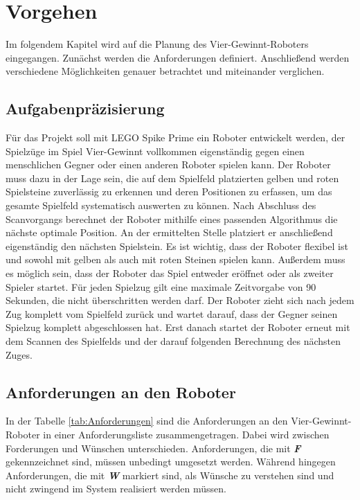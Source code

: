 \chapter{Vorgehen}
Im folgendem Kapitel wird auf die Planung des Vier-Gewinnt-Roboters eingegangen. Zunächst werden die Anforderungen definiert. Anschließend werden verschiedene Möglichkeiten genauer betrachtet und miteinander verglichen.

\section{Aufgabenpräzisierung}
Für das Projekt soll mit LEGO Spike Prime ein Roboter entwickelt werden, der Spielzüge im Spiel Vier-Gewinnt vollkommen eigenständig gegen einen menschlichen Gegner oder einen anderen Roboter spielen kann. Der Roboter muss dazu in der Lage sein, die auf dem Spielfeld platzierten gelben und roten Spielsteine zuverlässig zu erkennen und deren Positionen zu erfassen, um das gesamte Spielfeld systematisch auswerten zu können.\newline
Nach Abschluss des Scanvorgangs berechnet der Roboter mithilfe eines passenden Algorithmus die nächste optimale Position. An der ermittelten Stelle platziert er anschließend eigenständig den nächsten Spielstein. Es ist wichtig, dass der Roboter flexibel ist und sowohl mit gelben als auch mit roten Steinen spielen kann. Außerdem muss es möglich sein, dass der Roboter das Spiel entweder eröffnet oder als zweiter Spieler startet.\newline
Für jeden Spielzug gilt eine maximale Zeitvorgabe von 90 Sekunden, die nicht überschritten werden darf. Der Roboter zieht sich nach jedem Zug komplett vom Spielfeld zurück und wartet darauf, dass der Gegner seinen Spielzug komplett abgeschlossen hat. Erst danach startet der Roboter erneut mit dem Scannen des Spielfelds und der darauf folgenden Berechnung des nächsten Zuges.


\section{Anforderungen an den Roboter}
In der Tabelle \ref{tab:Anforderungen} sind die Anforderungen an den Vier-Gewinnt-Roboter in einer Anforderungsliste zusammengetragen. Dabei wird zwischen Forderungen und Wünschen unterschieden. Anforderungen, die mit \textsl{\textbf{F}} gekennzeichnet sind, müssen unbedingt umgesetzt werden. Während hingegen Anforderungen, die mit \textsl{\textbf{W}} markiert sind, als Wünsche zu verstehen sind und nicht zwingend im System realisiert werden müssen.

